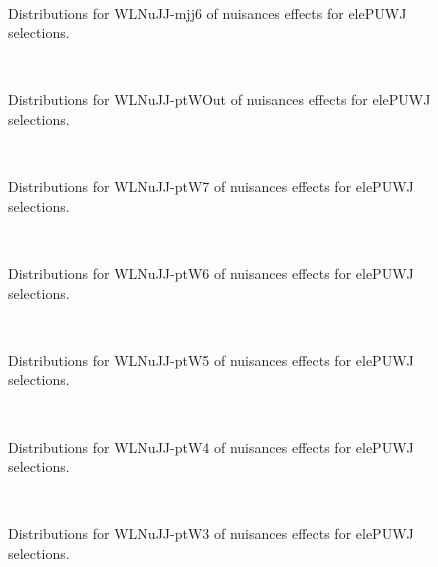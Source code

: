\begin{figure}[htbp]  
\centering 
\\ 
\caption{ 
   Distributions for WLNuJJ-mjj6 of nuisances effects for elePUWJ selections.
} 
\label{fig:WLNuJJ_mjj6_elePUWJ} 
\end{figure} 




\begin{figure}[htbp]  
\centering 
\\ 
\caption{ 
   Distributions for WLNuJJ-ptWOut of nuisances effects for elePUWJ selections.
} 
\label{fig:WLNuJJ_ptWOut_elePUWJ} 
\end{figure} 




\begin{figure}[htbp]  
\centering 
\\ 
\caption{ 
   Distributions for WLNuJJ-ptW7 of nuisances effects for elePUWJ selections.
} 
\label{fig:WLNuJJ_ptW7_elePUWJ} 
\end{figure} 




\begin{figure}[htbp]  
\centering 
\\ 
\caption{ 
   Distributions for WLNuJJ-ptW6 of nuisances effects for elePUWJ selections.
} 
\label{fig:WLNuJJ_ptW6_elePUWJ} 
\end{figure} 




\begin{figure}[htbp]  
\centering 
\\ 
\caption{ 
   Distributions for WLNuJJ-ptW5 of nuisances effects for elePUWJ selections.
} 
\label{fig:WLNuJJ_ptW5_elePUWJ} 
\end{figure} 




\begin{figure}[htbp]  
\centering 
\\ 
\caption{ 
   Distributions for WLNuJJ-ptW4 of nuisances effects for elePUWJ selections.
} 
\label{fig:WLNuJJ_ptW4_elePUWJ} 
\end{figure} 




\begin{figure}[htbp]  
\centering 
\\ 
\caption{ 
   Distributions for WLNuJJ-ptW3 of nuisances effects for elePUWJ selections.
} 
\label{fig:WLNuJJ_ptW3_elePUWJ} 
\end{figure} 




